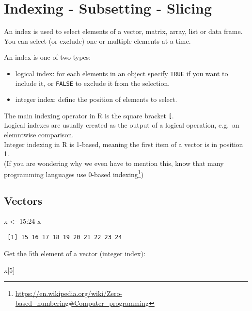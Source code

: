 \documentclass[
]{book}
\newenvironment{Shaded}{\begin{snugshade}}{\end{snugshade}}
\newcommand{\DecValTok}[1]{\textcolor[rgb]{0.00,0.00,0.81}{#1}}
\newcommand{\NormalTok}[1]{#1}
\newcommand{\OtherTok}[1]{\textcolor[rgb]{0.56,0.35,0.01}{#1}}
\newcommand{\SpecialCharTok}[1]{\textcolor[rgb]{0.00,0.00,0.00}{#1}}
\providecommand{\tightlist}{%
  \setlength{\itemsep}{0pt}\setlength{\parskip}{0pt}}
\renewcommand{\href}[2]{#2\footnote{\url{#1}}}
\begin{document}
\hypertarget{indexing}{%
\chapter{Indexing - Subsetting - Slicing}\label{indexing}}

An index is used to select elements of a vector, matrix, array, list or data frame.\\
You can select (or exclude) one or multiple elements at a time.

An index is one of two types:

\begin{itemize}
\tightlist
\item
  logical index: for each elements in an object specify \texttt{TRUE} if you want to include it, or \texttt{FALSE} to exclude it from the selection.
\item
  integer index: define the position of elements to select.
\end{itemize}

The main indexing operator in R is the square bracket \texttt{{[}}.\\
Logical indexes are usually created as the output of a logical operation, e.g.~an elemntwise comparison.\\
Integer indexing in R is 1-based, meaning the first item of a vector is in position 1.\\
(If you are wondering why we even have to mention this, know that many programming languages use \href{https://en.wikipedia.org/wiki/Zero-based_numbering\#Computer_programming}{0-based indexing})

\hypertarget{indexvectors}{%
\section{Vectors}\label{indexvectors}}

\begin{Shaded}
\begin{Highlighting}[]
\NormalTok{x }\OtherTok{\textless{}{-}} \DecValTok{15}\SpecialCharTok{:}\DecValTok{24}
\NormalTok{x}
\end{Highlighting}
\end{Shaded}

\begin{verbatim}
 [1] 15 16 17 18 19 20 21 22 23 24
\end{verbatim}

Get the 5th element of a vector (integer index):

\begin{Shaded}
\begin{Highlighting}[]
\NormalTok{x[}\DecValTok{5}\NormalTok{]}
\end{Highlighting}
\end{Shaded}
\end{document}

